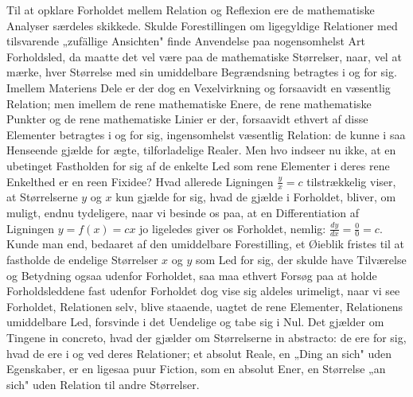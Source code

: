 \documentclass[12pt]{book}
\newcommand{\opage}[1]{\marginnote{\footnotesize\textit{[#1]}}}
\begin{document}
Til at opklare Forholdet mellem Relation og Reflexion ere de mathematiske Analyser
særdeles skikkede. Skulde Forestillingen om ligegyldige Relationer med tilsvarende
„zufällige Ansichten" finde Anvendelse paa nogensomhelst Art Forholdsled, da maatte
det vel være paa de mathematiske Størrelser, naar, vel at mærke, hver Størrelse med
sin umiddelbare Begrændsning betragtes i og for sig. Imellem Materiens Dele er der
dog en Vexelvirkning og forsaavidt en væsentlig Relation; men imellem de rene
mathematiske Enere, de rene mathematiske Punkter og de rene mathematiske Linier er
der, forsaavidt ethvert af disse Elementer betragtes i og for sig, ingensomhelst
væsentlig Relation: de kunne i saa Henseende gjælde for ægte, tilforladelige Realer.
Men hvo indseer nu ikke, at en ubetinget Fastholden for sig af de enkelte Led som
rene Elementer i deres rene Enkelthed er en reen Fixidee? Hvad allerede Ligningen
$\frac{y}{x} = c$ tilstrækkelig viser, at Størrelserne $y$ og $x$ kun gjælde for sig,
hvad de gjælde i Forholdet, bliver, om muligt, endnu tydeligere, naar vi besinde os
paa, at en Differentiation af Ligningen $y = f(x) = cx$ jo ligeledes giver os
Forholdet, nemlig: $\frac{dy}{dx} = \frac{0}{0} = c$. Kunde man end,
\opage{74} bedaaret af den umiddelbare Forestilling, et Øieblik fristes til at fastholde de
endelige Størrelser $x$ og $y$ som Led for sig, der skulde have Tilværelse og
Betydning ogsaa udenfor Forholdet, saa maa ethvert Forsøg paa at holde
Forholdsleddene fast udenfor Forholdet dog vise sig aldeles urimeligt, naar vi see
Forholdet, Relationen selv, blive staaende, uagtet de rene Elementer, Relationens
umiddelbare Led, forsvinde i det Uendelige og tabe sig i Nul. Det gjælder om Tingene
in concreto, hvad der gjælder om Størrelserne in abstracto: de ere for sig, hvad de
ere i og ved deres Relationer; et absolut Reale, en „Ding an sich" uden Egenskaber,
er en ligesaa puur Fiction, som en absolut Ener, en Størrelse „an sich" uden Relation
til andre Størrelser.
\end{document}
